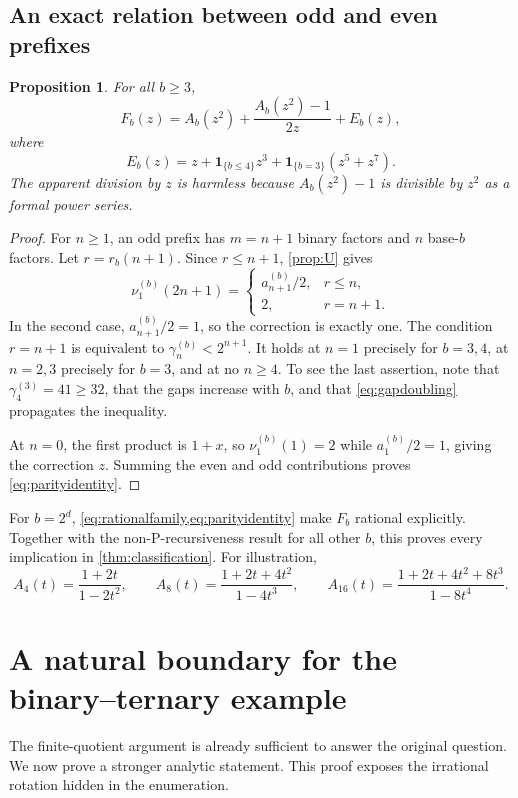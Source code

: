 \documentclass[11pt,letterpaper]{article}
\numberwithin{equation}{section}
\newtheorem{proposition}[proposition]{Proposition}
\theoremstyle{definition}
\theoremstyle{remark}
\newcommand{\ind}[1]{\mathbf 1_{\{#1\}}}
\begin{document}
\subsection{An exact relation between odd and even prefixes}
\begin{proposition}\label{prop:parity}
For all $b\ge3$,
\begin{equation}\label{eq:parityidentity}
 F_b(z)=A_b(z^2)+\frac{A_b(z^2)-1}{2z}+E_b(z),
\end{equation}
where
\begin{equation}\label{eq:correction}
 E_b(z)=z+\ind{b\le4}z^3+\ind{b=3}(z^5+z^7).
\end{equation}
The apparent division by $z$ is harmless because $A_b(z^2)-1$ is divisible by $z^2$ as a formal power series.
\end{proposition}
\begin{proof}
For $n\ge1$, an odd prefix has $m=n+1$ binary factors and $n$ base-$b$ factors. Let $r=r_b(n+1)$. Since $r\le n+1$, \cref{prop:U} gives
\[
 \nu_1^{(b)}(2n+1)=
 \begin{cases}
 a_{n+1}^{(b)}/2,&r\le n,\\
 2,&r=n+1.
 \end{cases}
\]
In the second case, $a_{n+1}^{(b)}/2=1$, so the correction is exactly one. The condition $r=n+1$ is equivalent to $\gamma_n^{(b)}<2^{n+1}$. It holds at $n=1$ precisely for $b=3,4$, at $n=2,3$ precisely for $b=3$, and at no $n\ge4$. To see the last assertion, note that $\gamma_4^{(3)}=41\ge32$, that the gaps increase with $b$, and that \eqref{eq:gapdoubling} propagates the inequality.

At $n=0$, the first product is $1+x$, so $\nu_1^{(b)}(1)=2$ while $a_1^{(b)}/2=1$, giving the correction $z$. Summing the even and odd contributions proves \eqref{eq:parityidentity}.
\end{proof}

For $b=2^d$, \cref{eq:rationalfamily,eq:parityidentity} make $F_b$ rational explicitly. Together with the non-P-recursiveness result for all other $b$, this proves every implication in \cref{thm:classification}. For illustration,
\[
 A_4(t)=\frac{1+2t}{1-2t^2},\qquad
 A_8(t)=\frac{1+2t+4t^2}{1-4t^3},\qquad
 A_{16}(t)=\frac{1+2t+4t^2+8t^3}{1-8t^4}.
\]

\section{A natural boundary for the binary--ternary example}\label{sec:boundary}
The finite-quotient argument is already sufficient to answer the original question. We now prove a stronger analytic statement. This proof exposes the irrational rotation hidden in the enumeration.
\end{document}
